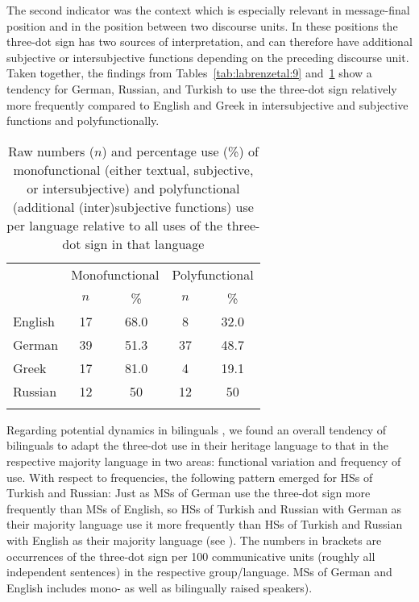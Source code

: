 \documentclass[output=paper,colorlinks,citecolor=brown]{langscibook}
\begin{document}
The second indicator \citep[cf.][261--62]{labrenz_three-dot_2022} was the context which is especially relevant in message-final position and in the position between two discourse units. In these positions the three-dot sign has two sources of interpretation, and can therefore have additional subjective or intersubjective functions depending on the preceding discourse unit. Taken together, the findings from Tables~\ref{tab:labrenzetal:9} and~\ref{tab:labrenzetal:10} show a tendency for German, Russian, and Turkish to use the three-dot sign relatively more frequently compared to English and Greek in intersubjective and subjective functions and polyfunctionally.

\begin{table}
\caption{Raw numbers ($n$) and percentage use (\%) of monofunctional (either textual, subjective, or intersubjective) and polyfunctional (additional (inter)subjective functions) use per language relative to all uses of the three-dot sign in that language}
\label{tab:labrenzetal:10}
 \centering
 \begin{tabular}{l  c  c  c  c}
  \lsptoprule
            & \multicolumn{2}{c}{Monofunctional} & \multicolumn{2}{c}{Polyfunctional} \\
   \cmidrule(lr){2-3} \cmidrule(lr){4-5}
            &  $n$  &  \%  &  $n$ &  \%  \\
  \midrule
  English  &   17  &    68.0  &    8  & 32.0 \\
  German  &   39  &    51.3  &    37  & 48.7 \\
  Greek  &   17  &    81.0  &    4  & 19.1 \\
  Russian  &   12  &    50  &    12  & 50 \\
  \lspbottomrule
 \end{tabular}
\end{table}

Regarding potential dynamics in bilinguals \citep[cf.][264--66]{labrenz_three-dot_2022}, we found an overall tendency of bilinguals to adapt the three-dot use in their heritage language to that in the respective majority language in two areas: functional variation and frequency of use. With respect to frequencies, the following pattern emerged for HSs of Turkish and Russian: Just as MSs of German use the three-dot sign more frequently than MSs of English, so HSs of Turkish and Russian with German as their majority language use it more frequently than HSs of Turkish and Russian with English as their majority language (see ). The numbers in brackets are occurrences of the three-dot sign per 100 communicative units (roughly all independent sentences) in the respective group\slash language. MSs of German and English includes mono- as well as bilingually raised speakers).
\end{document}
